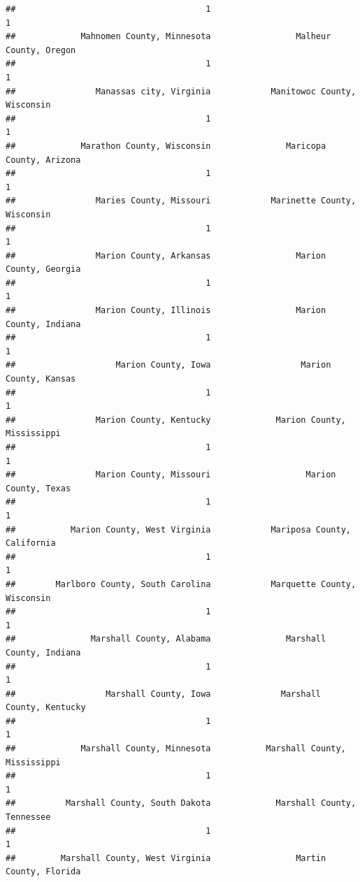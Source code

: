 \documentclass[
]{article}
\begin{document}
\begin{verbatim}
##                                      1                                      1 
##             Mahnomen County, Minnesota                 Malheur County, Oregon 
##                                      1                                      1 
##                Manassas city, Virginia            Manitowoc County, Wisconsin 
##                                      1                                      1 
##             Marathon County, Wisconsin               Maricopa County, Arizona 
##                                      1                                      1 
##                Maries County, Missouri            Marinette County, Wisconsin 
##                                      1                                      1 
##                Marion County, Arkansas                 Marion County, Georgia 
##                                      1                                      1 
##                Marion County, Illinois                 Marion County, Indiana 
##                                      1                                      1 
##                    Marion County, Iowa                  Marion County, Kansas 
##                                      1                                      1 
##                Marion County, Kentucky             Marion County, Mississippi 
##                                      1                                      1 
##                Marion County, Missouri                   Marion County, Texas 
##                                      1                                      1 
##           Marion County, West Virginia            Mariposa County, California 
##                                      1                                      1 
##        Marlboro County, South Carolina            Marquette County, Wisconsin 
##                                      1                                      1 
##               Marshall County, Alabama               Marshall County, Indiana 
##                                      1                                      1 
##                  Marshall County, Iowa              Marshall County, Kentucky 
##                                      1                                      1 
##             Marshall County, Minnesota           Marshall County, Mississippi 
##                                      1                                      1 
##          Marshall County, South Dakota             Marshall County, Tennessee 
##                                      1                                      1 
##         Marshall County, West Virginia                 Martin County, Florida 

\end{verbatim}
\end{document}
